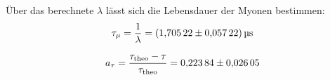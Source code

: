 Über das berechnete $\lambda$ lässt sich die Lebensdauer der Myonen bestimmen:
\begin{equation*}
    \tau_{\mu} = \frac{1}{\lambda} = \SI{1.70522+-0.05722}{\micro\second}
\end{equation*}

\begin{equation*}
    a_{\tau} = \frac{\tau_{\text{theo}} - \tau}{\tau_{\text{theo}}} = \num{0.22384 +- 0.02605}
\end{equation*}